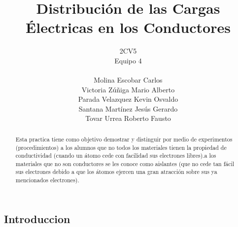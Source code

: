 \documentclass[11pt]{article}
\title{Distribución de las Cargas Électricas en los Conductores}
\author{2CV5\\Equipo 4\\\\Molina Escobar Carlos\\Victoria Zúñiga Mario Alberto\\Parada Velazquez Kevin Osvaldo\\Santana Martínez Jesús Gerardo\\Tovar Urrea Roberto Fausto}
\date{}
\begin{document}
	
\maketitle
\begin{abstract}
	Esta practica tiene como objetivo  demostrar y distinguir  por medio de experimentos (procedimientos) a los alumnos que no todos los materiales tienen la propiedad de conductividad (cuando un átomo cede con facilidad sus electrones libres).a los materiales que no son conductores se les conoce como aislantes (que no cede tan fácil sus electrones debido a que los átomos ejercen una gran atracción sobre sus ya mencionados electrones).
\end{abstract}


\begin{multicols}{2}
\section{Introduccion}

\end{multicols}
\end{document}
